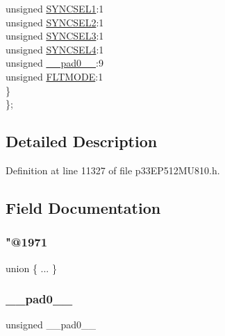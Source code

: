 \begin{DoxyCompactItemize}
\begin{tabbing}
\>\>unsigned \hyperlink{structtag_o_c4_c_o_n2_b_i_t_s_a50e73f95ab1c258ddc64f69c0991deaf}{SYNCSEL1}:1\\
\>\>unsigned \hyperlink{structtag_o_c4_c_o_n2_b_i_t_s_a304907a5d2c4cbf1114a54642a85951e}{SYNCSEL2}:1\\
\>\>unsigned \hyperlink{structtag_o_c4_c_o_n2_b_i_t_s_a6bbd1bd2ead6c9fa713969c6eb0f0c75}{SYNCSEL3}:1\\
\>\>unsigned \hyperlink{structtag_o_c4_c_o_n2_b_i_t_s_a0cd5bbe196c7974953909d27a6307bb7}{SYNCSEL4}:1\\
\>\>unsigned \hyperlink{structtag_o_c4_c_o_n2_b_i_t_s_adf71f3d8410c1f1dbbc96680a92c49af}{\_\_pad0\_\_}:9\\
\>\>unsigned \hyperlink{structtag_o_c4_c_o_n2_b_i_t_s_ad53c2a5303780172219bfd5e0100c782}{FLTMODE}:1\\
\>\} \\
\}; \\

\end{tabbing}\end{DoxyCompactItemize}


\subsection{Detailed Description}


Definition at line 11327 of file p33\+E\+P512\+M\+U810.\+h.



\subsection{Field Documentation}
\mbox{\label{structtag_o_c4_c_o_n2_b_i_t_s_a76c8566b80342b14e078553da19593eb}} 
\subsubsection{\texorpdfstring{"@1971}{@1971}}
{\footnotesize\ttfamily union \{ ... \} }

\mbox{\label{structtag_o_c4_c_o_n2_b_i_t_s_adf71f3d8410c1f1dbbc96680a92c49af}} 
\subsubsection{\texorpdfstring{\+\_\+\+\_\+pad0\+\_\+\+\_\+}{\_\_pad0\_\_}}
{\footnotesize\ttfamily unsigned \+\_\+\+\_\+pad0\+\_\+\+\_\+}



